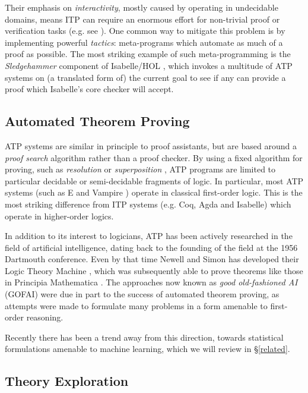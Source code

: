 \documentclass[]{article}
\begin{document}
Their emphasis on \emph{interactivity}, mostly caused by operating in undecidable domains, means ITP can require an enormous effort for non-trivial proof or verification tasks (e.g. see \cite{hales2015formal}). One common way to mitigate this problem is by implementing powerful \emph{tactics}: meta-programs which automate as much of a proof as possible. The most striking example of such meta-programming is the \emph{Sledgehammer} component of Isabelle/HOL \cite{journals/iandc/MengQP06}, which invokes a multitude of ATP systems on (a translated form of) the current goal to see if any can provide a proof which Isabelle's core checker will accept.

\subsection{Automated Theorem Proving}
\label{atp}

ATP systems are similar in principle to proof assistants, but are based around a \emph{proof search} algorithm rather than a proof checker. By using a fixed algorithm for proving, such as \emph{resolution} \cite[\S~9.6]{Russell:2003:AIM:773294} or \emph{superposition} \cite{bachmair1994rewrite}, ATP programs are limited to particular decidable or semi-decidable fragments of logic. In particular, most ATP systems (such as E \cite{schulz2013system} and Vampire \cite{riazanov2003implementing}) operate in classical first-order logic. This is the most striking difference from ITP systems (e.g. Coq, Agda and Isabelle) which operate in higher-order logics.

In addition to its interest to logicians, ATP has been actively researched in the field of artificial intelligence, dating back to the founding of the field at the 1956 Dartmouth conference. Even by that time Newell and Simon has developed their Logic Theory Machine \cite{newell1956logic}, which was subsequently able to prove theorems like those in Principia Mathematica \cite{newell1958elements}. The approaches now known as \emph{good old-fashioned AI} (GOFAI) were due in part to the success of automated theorem proving, as attempts were made to formulate many problems in a form amenable to first-order reasoning.

Recently there has been a trend away from this direction, towards statistical formulations amenable to machine learning, which we will review in \S \ref{related}.

\subsection{Theory Exploration}
\label{theoryexploration}
\end{document}
